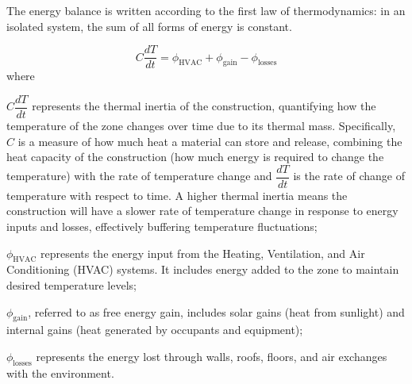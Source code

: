 \documentclass[runningheads]{llncs}
\begin{document}
The energy balance is written according to the first law of thermodynamics: in an isolated system, the sum of all forms of energy is constant.

\begin{equation}
    C \frac{dT}{dt} = \phi_{\mathrm{HVAC}} + \phi_{\mathrm{gain}} - \phi_{\mathrm{losses}}
\end{equation}
where
\begin{inparaenum}[\it (i)]
    \item $C \dfrac{dT}{dt}$ represents the thermal inertia of the construction, quantifying how the temperature of the zone changes over time due to its thermal mass. Specifically,
    $C$ is a measure of how much heat a material can store and release, combining the heat capacity of the construction (how much energy is required to change the temperature) with the rate of temperature change and 
    $\dfrac{dT}{dt}$ is the rate of change of temperature with respect to time. A higher thermal inertia means the construction will have a slower rate of temperature change in response to energy inputs and losses, effectively buffering temperature fluctuations;
    \item $\phi_{\mathrm{HVAC}}$ represents the energy input from the Heating, Ventilation, and Air Conditioning (HVAC) systems. It includes energy added to the zone to maintain desired temperature levels;
    \item $\phi_{\mathrm{gain}}$, referred to as free energy gain, includes solar gains (heat from sunlight) and internal gains (heat generated by occupants and equipment);
    \item $\phi_{\mathrm{losses}}$ represents the energy lost through walls, roofs, floors, and air exchanges with the environment.
\end{inparaenum}
\end{document}
